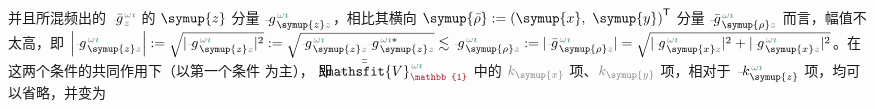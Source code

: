 并且所混频出的 $\Xint{{}^{}_{\mathcolor{gray}{-}}}{10}{\bar{g}}^{\;\!\mathcolor{gray}{\omega} \textcolor{ForestGreen}{\imath}}_{\;\! \mathcolor{gray}{z}}$ 的 $\symup{z}$ 分量 $\Xint{{}^{}_{\mathcolor{gray}{-}}}{10}{g}^{\;\!\mathcolor{gray}{\omega} \textcolor{ForestGreen}{\imath}}_{\;\! \symup{z} \mathcolor{gray}{z}}$，相比其横向 $\symup{\bar{\rho}} := \left( \symup{x},~ \symup{y} \right)^\mathsf{T}$ 分量 $\Xint{{}^{}_{\mathcolor{gray}{-}}}{10}{\bar{g}}^{\;\!\mathcolor{gray}{\omega} \textcolor{ForestGreen}{\imath}}_{\;\! \symup{\rho} \mathcolor{gray}{z}}$ 而言，幅值不太高，即 $\left| \Xint{{}^{}_{\mathcolor{gray}{-}}}{10}{g}^{\;\!\mathcolor{gray}{\omega} \textcolor{ForestGreen}{\imath}}_{\;\! \symup{z} \mathcolor{gray}{z}} \right| := \sqrt{ \lvert \Xint{{}^{}_{\mathcolor{gray}{-}}}{10}{g}^{\;\!\mathcolor{gray}{\omega} \textcolor{ForestGreen}{\imath}}_{\;\! \symup{z} \mathcolor{gray}{z}} \rvert^2 } := \sqrt{ \Xint{{}^{}_{\mathcolor{gray}{-}}}{10}{g}^{\;\!\mathcolor{gray}{\omega} \textcolor{ForestGreen}{\imath}}_{\;\! \symup{z} \mathcolor{gray}{z}} \Xint{{}^{}_{\mathcolor{gray}{-}}}{10}{g}^{\;\!\mathcolor{gray}{\omega} \textcolor{ForestGreen}{\imath} *}_{\;\! \symup{z} \mathcolor{gray}{z}} } \lesssim \Xint{{}^{}_{\mathcolor{gray}{-}}}{10}{g}^{\;\!\mathcolor{gray}{\omega} \textcolor{ForestGreen}{\imath}}_{\;\! \symup{\rho} \mathcolor{gray}{z}} := \lvert \Xint{{}^{}_{\mathcolor{gray}{-}}}{10}{\bar{g}}^{\;\!\mathcolor{gray}{\omega} \textcolor{ForestGreen}{\imath}}_{\;\! \symup{\rho} \mathcolor{gray}{z}} \rvert = \sqrt{ \lvert \Xint{{}^{}_{\mathcolor{gray}{-}}}{10}{g}^{\;\! \mathcolor{gray}{\omega} \textcolor{ForestGreen}{\imath}}_{\;\! \symup{x} \mathcolor{gray}{z}} \rvert^2 + \lvert \Xint{{}^{}_{\mathcolor{gray}{-}}}{10}{g}^{\;\! \mathcolor{gray}{\omega} \textcolor{ForestGreen}{\imath}}_{\;\! \symup{x} \mathcolor{gray}{z}} \rvert^2 }$。在这两个条件的共同作用下（以第一个条件  为主）， 即 $\Xint{\mathcolor{gray}{-}}{25}{\bar{\bar{\mathsfit{V}}}}^{\;\! \mathcolor{gray}{\omega} \textcolor{ForestGreen}{\imath}}_{\textcolor{Maroon}{\mathbb{1}}}$ 中的 $\mathcolor{gray}{k_{\symup{x}}}$ 项、$\mathcolor{gray}{k_{\symup{y}}}$ 项，相对于 $\Xint{\begin{smallmatrix} ~ \\ {}^{}_{\mathcolor{gray}{-}} \\ ~ \end{smallmatrix}}{15}{k}_{\symup{z}}^{\;\! \mathcolor{gray}{\omega} \textcolor{ForestGreen}{\imath}}$ 项，均可以省略，并变为
